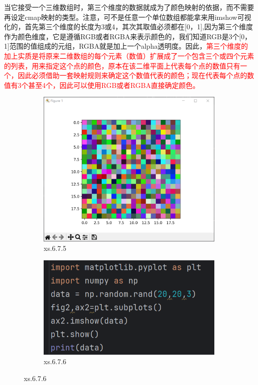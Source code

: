 \documentclass[12pt]{article}
\begin{document}
当它接受一个三维数组时，第三个维度的数据就成为了颜色映射的依据，而不需要再设定cmap映射的类型。注意，可不是任意一个单位数组都能拿来用imshow可视化的，首先第三个维度的长度为3或4，其次其取值必须都在[0，1],因为第三个维度作为颜色维度，它是遵循RGB或者RGBA来表示颜色的，我们知道RGB是3个[0，1]范围的值组成的元组，RGBA就是加上一个alpha透明度。因此，\textcolor{red}{第三个维度的加上实质是将原来二维数组的每个元素（数值）扩展成了一个包含三个或四个元素的列表，用来指定这个点的颜色，原本在该二维平面上代表每个点的数值只有一个，因此必须借助一套映射规则来确定这个数值代表的颜色；现在代表每个点的数值有3个甚至4个，因此可以使用RGB或者RGBA直接确定颜色。}
\begin{figure}[H]
    \centering
    \begin{subfigure}[b]{0.48\textwidth}
        \includegraphics[width=\textwidth]{颜色映射 三维 Pic1.png} %
        \caption{xs.6.7.5}
        \label{fig:line-graph2}
    \end{subfigure}
    \hfill
    \begin{subfigure}[b]{0.48\textwidth}
        \includegraphics[width=\textwidth]{颜色映射 三维 program1.png} %
        \caption{xs.6.7.6}
        \label{fig:line-graph2-pic2}
    \end{subfigure}
\end{figure}
\end{document}
